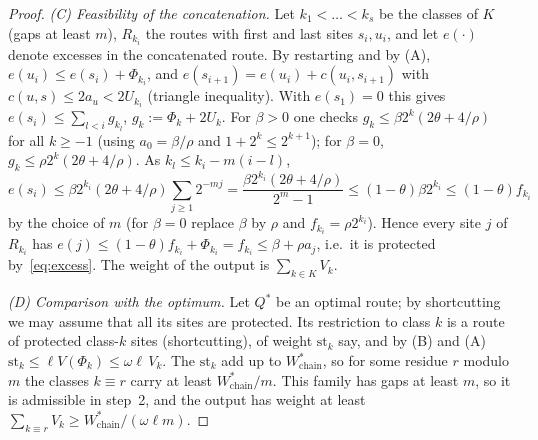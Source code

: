 \documentclass[pdflatex,sn-mathphys-ay]{sn-jnl}
\theoremstyle{thmstyleone}
\theoremstyle{thmstyletwo}
\theoremstyle{thmstylethree}
\begin{document}
\begin{proof}
\emph{(C) Feasibility of the concatenation.} Let $k_1<\dots<k_s$ be the classes of $K$ (gaps at least $m$),
$R_{k_i}$ the routes with first and last sites $s_i,u_i$, and let $e(\cdot)$ denote
excesses in the concatenated route. By restarting and by (A),
$e(u_i)\le e(s_i)+\Phi_{k_i}$, and $e(s_{i+1})=e(u_i)+c(u_i,s_{i+1})$ with
$c(u,s)\le2a_u<2U_{k_i}$ (triangle inequality). With $e(s_1)=0$ this gives
$e(s_i)\le\sum_{l<i}g_{k_l}$, $g_k:=\Phi_k+2U_k$. For $\beta>0$ one checks
$g_k\le\beta2^k(2\theta+4/\rho)$ for all $k\ge-1$ (using $a_0=\beta/\rho$ and
$1+2^k\le2^{k+1}$); for $\beta=0$, $g_k\le\rho2^k(2\theta+4/\rho)$.
As $k_l\le k_i-m(i-l)$,
\[
e(s_i)\le\beta2^{k_i}(2\theta+4/\rho)\sum_{j\ge1}2^{-mj}
=\frac{\beta2^{k_i}(2\theta+4/\rho)}{2^m-1}\le(1-\theta)\beta2^{k_i}\le(1-\theta)f_{k_i}
\]
by the choice of $m$ (for $\beta=0$ replace $\beta$ by $\rho$ and $f_{k_i}=\rho2^{k_i}$).
Hence every site $j$ of $R_{k_i}$ has $e(j)\le(1-\theta)f_{k_i}+\Phi_{k_i}=f_{k_i}\le\beta+\rho a_j$,
i.e.\ it is protected by~\eqref{eq:excess}. The weight of the output is $\sum_{k\in K}V_k$.

\emph{(D) Comparison with the optimum.} Let $Q^\ast$ be an optimal route; by shortcutting we may
assume that all its sites are protected. Its restriction to class $k$ is a route
of protected class-$k$ sites (shortcutting), of weight $\mathrm{st}_k$ say, and by (B) and (A)
$\mathrm{st}_k\le\ell V(\Phi_k)\le\omega\ell\,V_k$. The $\mathrm{st}_k$ add up to $W^\ast_{\mathrm{chain}}$,
so for some residue $r$ modulo $m$ the classes $k\equiv r$ carry at least
$W^\ast_{\mathrm{chain}}/m$. This family has gaps at least $m$, so it is admissible in
step~2, and the output has weight at least $\sum_{k\equiv r}V_k\ge W^\ast_{\mathrm{chain}}/(\omega\ell m)$.
\end{proof}
\end{document}
